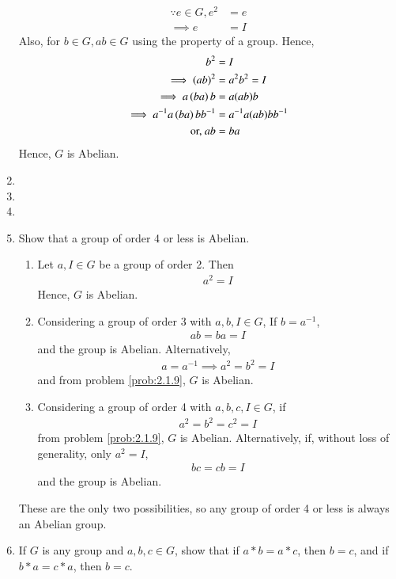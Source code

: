 \begin{enumerate}[label=\arabic*.,ref=\thesubsection.\theenumi]
	\solution 
\begin{align}
	\because e \in G, e^2 &= e	
	\\
	\implies e &=I
\end{align}
Also, for $b \in G, ab \in G$ using the property of a group.  Hence, 
\begin{align}
 b^2 &= I
	\\
	\implies \left(ab\right)^2 &=a^2b^2=I
	\\
	\implies a\left(ba\right)b &= a(ab)b
	\\
	\implies a^{-1}a\left(ba\right)bb^{-1} &= a^{-1}a(ab)bb^{-1}
\\
	\text{or, } ab &=ba
\end{align}
Hence, $G$ is Abelian.
\item 
\item 
\item 
\item Show that a group of order 4 or less is Abelian.
	\\
	\solution 
	\begin{enumerate}
		\item Let $a,I \in G$ be a group of order 2. Then
			\begin{align}
				a^2 = I
			\end{align}
			Hence, $G$ is Abelian.
		\item Considering a group of order 3 with $a,b,I \in G$, 
			If $b = a^{-1}$,
			\begin{align}
				ab = ba = I
			\end{align}
			and the group is Abelian.  Alternatively, 
			\begin{align}
				a = a^{-1} \implies a^2 = b^2 = I
			\end{align}
			and from problem  
	\ref{prob:2.1.9}, $G$ is Abelian.
\item Considering a group of order 4 with $a, b, c, I \in G$, if 
	\label{sol:2.13.3}
			\begin{align}
				 a^2 = b^2 = c^2 = I
			\end{align}
			from problem  
	\ref{prob:2.1.9}, $G$ is Abelian. Alternatively, if, without loss of generality, only $a^2=I$, 
			\begin{align}
				 bc = cb = I
			\end{align}
			and the group is Abelian.  
	\end{enumerate}
These are the only two possibilities, so any group of order 4 or less is always an Abelian group.
\item
	If $G$ is any group and $a, b, c \in G$, show that if $a * b = a * c$, then $b = c$, and if $b * a = c * a$, then $b = c$.

\end{enumerate}

